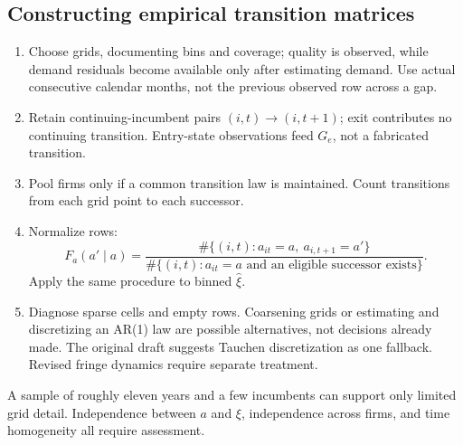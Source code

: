 \documentclass[11pt]{article}
\begin{document}
\subsection*{Constructing empirical transition matrices}
\begin{enumerate}
\item Choose grids, documenting bins and coverage; quality is observed, while demand residuals become available only after estimating demand. Use actual consecutive calendar months, not the previous observed row across a gap.
\item Retain continuing-incumbent pairs $(i,t)\to(i,t+1)$; exit contributes no continuing transition. Entry-state observations feed $G_e$, not a fabricated transition.
\item Pool firms only if a common transition law is maintained. Count transitions from each grid point to each successor.
\item Normalize rows:
\begin{equation}
F_a(a'\mid a)=\frac{\#\{(i,t):a_{it}=a,\ a_{i,t+1}=a'\}}{\#\{(i,t):a_{it}=a\text{ and an eligible successor exists}\}}.
\end{equation}
Apply the same procedure to binned $\widehat\xi$.
\item Diagnose sparse cells and empty rows. Coarsening grids or estimating and discretizing an AR(1) law are possible alternatives, not decisions already made. The original draft suggests Tauchen discretization as one fallback. Revised fringe dynamics require separate treatment.
\end{enumerate}
A sample of roughly eleven years and a few incumbents can support only limited grid detail. Independence between $a$ and $\xi$, independence across firms, and time homogeneity all require assessment.
\end{document}
